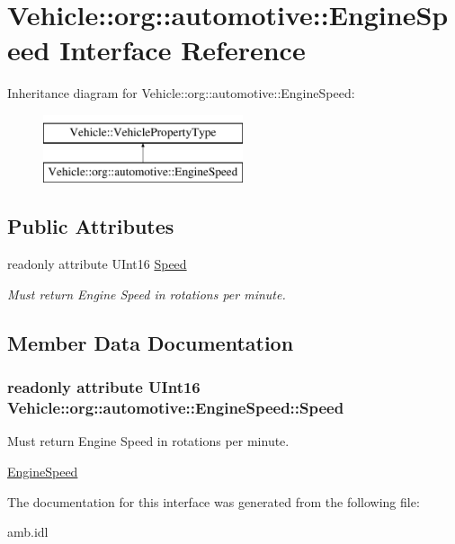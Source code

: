 \hypertarget{interfaceVehicle_1_1org_1_1automotive_1_1EngineSpeed}{\section{Vehicle\-:\-:org\-:\-:automotive\-:\-:Engine\-Speed Interface Reference}
\label{interfaceVehicle_1_1org_1_1automotive_1_1EngineSpeed}
}
Inheritance diagram for Vehicle\-:\-:org\-:\-:automotive\-:\-:Engine\-Speed\-:\begin{figure}[H]
\begin{center}
\leavevmode
\includegraphics[height=2.000000cm]{interfaceVehicle_1_1org_1_1automotive_1_1EngineSpeed}
\end{center}
\end{figure}
\subsection*{Public Attributes}
\begin{DoxyCompactItemize}
\item 
readonly attribute U\-Int16 \hyperlink{interfaceVehicle_1_1org_1_1automotive_1_1EngineSpeed_ae1ccb83089784e0539a2e92655efba70}{Speed}
\begin{DoxyCompactList}\small\item\em Must return Engine Speed in rotations per minute. \end{DoxyCompactList}\end{DoxyCompactItemize}


\subsection{Member Data Documentation}
\hypertarget{interfaceVehicle_1_1org_1_1automotive_1_1EngineSpeed_ae1ccb83089784e0539a2e92655efba70}{
\subsubsection[{Speed}]{\setlength{\rightskip}{0pt plus 5cm}readonly attribute U\-Int16 Vehicle\-::org\-::automotive\-::\-Engine\-Speed\-::\-Speed}}\label{interfaceVehicle_1_1org_1_1automotive_1_1EngineSpeed_ae1ccb83089784e0539a2e92655efba70}


Must return Engine Speed in rotations per minute. 

\hyperlink{interfaceVehicle_1_1org_1_1automotive_1_1EngineSpeed}{Engine\-Speed} 

The documentation for this interface was generated from the following file\-:\begin{DoxyCompactItemize}
\item 
amb.\-idl\end{DoxyCompactItemize}
